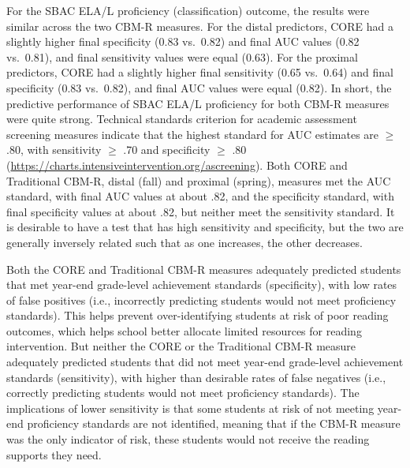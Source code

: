 \documentclass[
  english,
  man, fleqn, noextraspace]{apa6}
\begin{document}
For the SBAC ELA/L proficiency (classification) outcome, the results were similar across the two CBM-R measures. For the distal predictors, CORE had a slightly higher final specificity (0.83 vs.~0.82) and final AUC values (0.82 vs.~0.81), and final sensitivity values were equal (0.63). For the proximal predictors, CORE had a slightly higher final sensitivity (0.65 vs.~0.64) and final specificity (0.83 vs.~0.82), and final AUC values were equal (0.82). In short, the predictive performance of SBAC ELA/L proficiency for both CBM-R measures were quite strong. Technical standards criterion for academic assessment screening measures indicate that the highest standard for AUC estimates are \(\geq\) .80, with sensitivity \(\geq\) .70 and specificity \(\geq\) .80 (\url{https://charts.intensiveintervention.org/ascreening}). Both CORE and Traditional CBM-R, distal (fall) and proximal (spring), measures met the AUC standard, with final AUC values at about .82, and the specificity standard, with final specificity values at about .82, but neither meet the sensitivity standard. It is desirable to have a test that has high sensitivity and specificity, but the two are generally inversely related such that as one increases, the other decreases.

Both the CORE and Traditional CBM-R measures adequately predicted students that met year-end grade-level achievement standards (specificity), with low rates of false positives (i.e., incorrectly predicting students would not meet proficiency standards). This helps prevent over-identifying students at risk of poor reading outcomes, which helps school better allocate limited resources for reading intervention. But neither the CORE or the Traditional CBM-R measure adequately predicted students that did not meet year-end grade-level achievement standards (sensitivity), with higher than desirable rates of false negatives (i.e., correctly predicting students would not meet proficiency standards). The implications of lower sensitivity is that some students at risk of not meeting year-end proficiency standards are not identified, meaning that if the CBM-R measure was the only indicator of risk, these students would not receive the reading supports they need.
\end{document}
